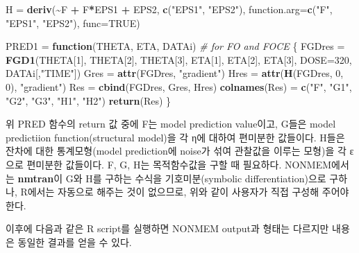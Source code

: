 \documentclass[
  10pt,
  krantz2,
  a4paper]{krantz}
\newenvironment{Shaded}{\begin{snugshade}}{\end{snugshade}}
\newcommand{\CommentTok}[1]{\textcolor[rgb]{0.56,0.35,0.01}{\textit{#1}}}
\newcommand{\ControlFlowTok}[1]{\textcolor[rgb]{0.13,0.29,0.53}{\textbf{#1}}}
\newcommand{\DataTypeTok}[1]{\textcolor[rgb]{0.13,0.29,0.53}{#1}}
\newcommand{\DecValTok}[1]{\textcolor[rgb]{0.00,0.00,0.81}{#1}}
\newcommand{\KeywordTok}[1]{\textcolor[rgb]{0.13,0.29,0.53}{\textbf{#1}}}
\newcommand{\NormalTok}[1]{#1}
\newcommand{\OperatorTok}[1]{\textcolor[rgb]{0.81,0.36,0.00}{\textbf{#1}}}
\newcommand{\OtherTok}[1]{\textcolor[rgb]{0.56,0.35,0.01}{#1}}
\newcommand{\StringTok}[1]{\textcolor[rgb]{0.31,0.60,0.02}{#1}}
\theoremstyle{definition}
\theoremstyle{definition}
\theoremstyle{definition}
\theoremstyle{remark}
\begin{document}
\begin{Shaded}
\begin{Highlighting}[]
\NormalTok{H =}\StringTok{ }\KeywordTok{deriv}\NormalTok{(}\OperatorTok{\textasciitilde{}}\NormalTok{F }\OperatorTok{+}\StringTok{ }\NormalTok{F}\OperatorTok{*}\NormalTok{EPS1 }\OperatorTok{+}\StringTok{ }\NormalTok{EPS2, }\KeywordTok{c}\NormalTok{(}\StringTok{"EPS1"}\NormalTok{, }\StringTok{"EPS2"}\NormalTok{), }
          \DataTypeTok{function.arg=}\KeywordTok{c}\NormalTok{(}\StringTok{"F"}\NormalTok{, }\StringTok{"EPS1"}\NormalTok{, }\StringTok{"EPS2"}\NormalTok{), }
          \DataTypeTok{func=}\OtherTok{TRUE}\NormalTok{)}

\NormalTok{PRED1 =}\StringTok{ }\ControlFlowTok{function}\NormalTok{(THETA, ETA, DATAi)  }\CommentTok{\# for FO and FOCE}
\NormalTok{\{}
\NormalTok{  FGDres =}\StringTok{ }\KeywordTok{FGD1}\NormalTok{(THETA[}\DecValTok{1}\NormalTok{], THETA[}\DecValTok{2}\NormalTok{], THETA[}\DecValTok{3}\NormalTok{], ETA[}\DecValTok{1}\NormalTok{], ETA[}\DecValTok{2}\NormalTok{], ETA[}\DecValTok{3}\NormalTok{], }\DataTypeTok{DOSE=}\DecValTok{320}\NormalTok{, }
\NormalTok{                DATAi[,}\StringTok{"TIME"}\NormalTok{])}
\NormalTok{  Gres =}\StringTok{ }\KeywordTok{attr}\NormalTok{(FGDres, }\StringTok{"gradient"}\NormalTok{)}
\NormalTok{  Hres =}\StringTok{ }\KeywordTok{attr}\NormalTok{(}\KeywordTok{H}\NormalTok{(FGDres, }\DecValTok{0}\NormalTok{, }\DecValTok{0}\NormalTok{), }\StringTok{"gradient"}\NormalTok{)}
\NormalTok{  Res =}\StringTok{ }\KeywordTok{cbind}\NormalTok{(FGDres, Gres, Hres)}
  \KeywordTok{colnames}\NormalTok{(Res) =}\StringTok{ }\KeywordTok{c}\NormalTok{(}\StringTok{"F"}\NormalTok{, }\StringTok{"G1"}\NormalTok{, }\StringTok{"G2"}\NormalTok{, }\StringTok{"G3"}\NormalTok{, }\StringTok{"H1"}\NormalTok{, }\StringTok{"H2"}\NormalTok{)}
  \KeywordTok{return}\NormalTok{(Res)}
\NormalTok{\}}
\end{Highlighting}
\end{Shaded}

위 PRED 함수의 return 값 중에 F는 model prediction value이고, G들은 model predictiion function(structural model)을 각 η에 대하여 편미분한 값들이다. H들은 잔차에 대한 통계모형(model prediction에 noise가 섞여 관찰값을 이루는 모형)을 각 ε으로 편미분한 값들이다. F, G, H는 목적함수값을 구할 때 필요하다. NONMEM에서는 \textbf{nmtran}이 G와 H를 구하는 수식을 기호미분(symbolic differentiation)으로 구하나, R에서는 자동으로 해주는 것이 없으므로, 위와 같이 사용자가 직접 구성해 주어야 한다.

이후에 다음과 같은 R script를 실행하면 NONMEM output과 형태는 다르지만 내용은 동일한 결과를 얻을 수 있다.
\end{document}
